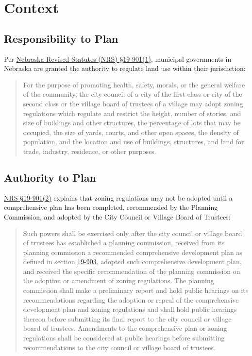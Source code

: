 \section{Context}

\subsection{Responsibility to Plan}

\noindent Per \href{https://nebraskalegislature.gov/laws/statutes.php?statute=19-901}{Nebraska Revised Statutes (NRS) \S 19-901(1)}, municipal governments in Nebraska are granted the authority to regulate land use within their jurisdiction:

\begin{quote}
    For the purpose of promoting health, safety, morals, or the general welfare of the community, the city council of a city of the first class or city of the second class or the village board of trustees of a village may adopt zoning regulations which regulate and restrict the height, number of stories, and size of buildings and other structures, the percentage of lots that may be occupied, the size of yards, courts, and other open spaces, the density of population, and the location and use of buildings, structures, and land for trade, industry, residence, or other purposes.
\end{quote}

\subsection{Authority to Plan}

\noindent \href{https://nebraskalegislature.gov/laws/statutes.php?statute=19-901}{NRS \S 19-901(2)} explains that zoning regulations may not be adopted until a comprehensive plan has been completed, recommended by the Planning Commission, and adopted by the City Council or Village Board of Trustees:

\begin{quote}
    Such powers shall be exercised only after the city council or village board of trustees has established a planning commission, received from its planning commission a recommended comprehensive development plan as defined in section \href{https://nebraskalegislature.gov/laws/statutes.php?statute=19-903}{19-903}, adopted such comprehensive development plan, and received the specific recommendation of the planning commission on the adoption or amendment of zoning regulations. The planning commission shall make a preliminary report and hold public hearings on its recommendations regarding the adoption or repeal of the comprehensive development plan and zoning regulations and shall hold public hearings thereon before submitting its final report to the city council or village board of trustees. Amendments to the comprehensive plan or zoning regulations shall be considered at public hearings before submitting recommendations to the city council or village board of trustees.
\end{quote}

